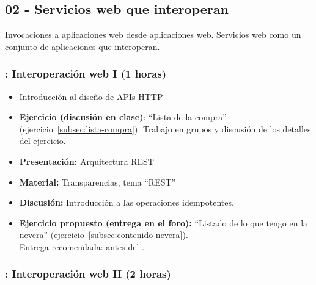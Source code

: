 \documentclass[a4paper,12pt]{article}
\begin{document}
\subsection{02 - Servicios web que interoperan}

Invocaciones a aplicaciones web desde aplicaciones web. Servicios web como un conjunto de aplicaciones que interoperan.

\subsubsection{\juevesF: Interoperación web I (1 horas)}
\label{cal:juevesF}

\begin{itemize}
\item Introducción al diseño de APIs HTTP
\item \textbf{Ejercicio (discusión en clase)}: ``Lista de la compra'' (ejercicio~\ref{subsec:lista-compra}).
  Trabajo en grupos y discusión de los detalles del ejercicio.
\item \textbf{Presentación:} Arquitectura REST
\item \textbf{Material:} Transparencias, tema ``REST''
\item \textbf{Discusión:} Introducción a las operaciones idempotentes.
\item \textbf{Ejercicio propuesto (entrega en el foro):} ``Listado de lo que tengo en la nevera'' (ejercicio~\ref{subsec:contenido-nevera}). \\
  Entrega recomendada: antes del \juevesG.
\end{itemize}

\subsubsection{\juevesG: Interoperación web II (2 horas)}
\label{cal:juevesG}
\end{document}

